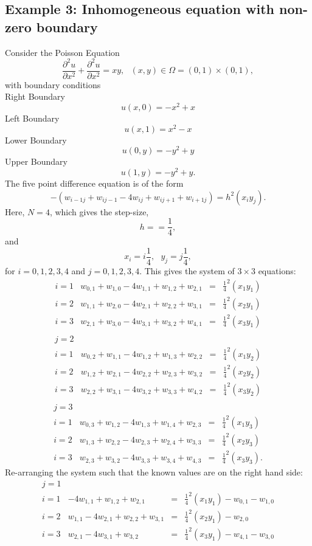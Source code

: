 \subsection{Example 3: Inhomogeneous equation with non-zero boundary}
Consider the Poisson Equation 
\[ \frac{\partial^2 u}{\partial x^2}+\frac{\partial^2 u}{\partial x^2}=xy, \ \ \ (x,y) \in \Omega=(0,1)\times (0,1), \]
with boundary conditions\\
Right Boundary
\[u(x,0) =-x^2+x \]
Left Boundary
\[u(x,1) = x^2-x  \]
Lower Boundary
\[u(0,y) = -y^2+y \]
Upper Boundary
\[u(1,y) =  -y^2+y. \]
The five point difference equation is of the form 
\[-(w_{i-1j}+w_{ij-1}-4w_{ij}+w_{ij+1}+w_{i+1j})=h^2(x_iy_j). \]
Here, $N=4$, which gives the step-size,
\[h==\frac{1}{4},\]
and
\[x_i=i\frac{1}{4}, \ \ \ y_j=j\frac{1}{4},\]
for $i=0,1,2,3,4$ and $j=0,1,2,3,4$.
This gives the system of $3\times 3$ equations:
\[\begin{array}{l|rcl}
i=1&w_{0,1}+w_{1,0}-4w_{1,1}+w_{1,2}+w_{2,1}&=&\frac{1}{4}^2(x_1y_1)\\
i=2&w_{1,1}+w_{2,0}-4w_{2,1}+w_{2,2}+w_{3,1}&=&\frac{1}{4}^2(x_2y_1)\\
i=3&w_{2,1}+w_{3,0}-4w_{3,1}+w_{3,2}+w_{4,1}&=&\frac{1}{4}^2(x_3y_1)\\
\end{array}\]	
\[\begin{array}{l|rcl}
j=2\\
i=1&w_{0,2}+w_{1,1}-4w_{1,2}+w_{1,3}+w_{2,2}&=&\frac{1}{4}^2(x_1y_2)\\
i=2&w_{1,2}+w_{2,1}-4w_{2,2}+w_{2,3}+w_{3,2}&=&\frac{1}{4}^2(x_2y_2)\\
i=3&w_{2,2}+w_{3,1}-4w_{3,2}+w_{3,3}+w_{4,2}&=&\frac{1}{4}^2(x_3y_2)\\
\end{array}\]	
\[\begin{array}{l|rcl}
j=3\\
i=1&w_{0,3}+w_{1,2}-4w_{1,3}+w_{1,4}+w_{2,3}&=&\frac{1}{4}^2(x_1y_3)\\
i=2&w_{1,3}+w_{2,2}-4w_{2,3}+w_{2,4}+w_{3,3}&=&\frac{1}{4}^2(x_2y_3)\\
i=3&w_{2,3}+w_{3,2}-4w_{3,3}+w_{3,4}+w_{4,3}&=&\frac{1}{4}^2(x_3y_3).
\end{array}
\]	
Re-arranging the system such that the known values are on the right hand side:
\[\begin{array}{l|rcl}
j=1\\
i=1&-4w_{1,1}+w_{1,2}+w_{2,1}&=&\frac{1}{4}^2(x_1y_1)-w_{0,1}-w_{1,0}\\
i=2&w_{1,1}-4w_{2,1}+w_{2,2}+w_{3,1}&=&\frac{1}{4}^2(x_2y_1)-w_{2,0}\\
i=3&w_{2,1}-4w_{3,1}+w_{3,2}&=&\frac{1}{4}^2(x_3y_1)-w_{4,1}-w_{3,0}\\
\end{array}\]	
